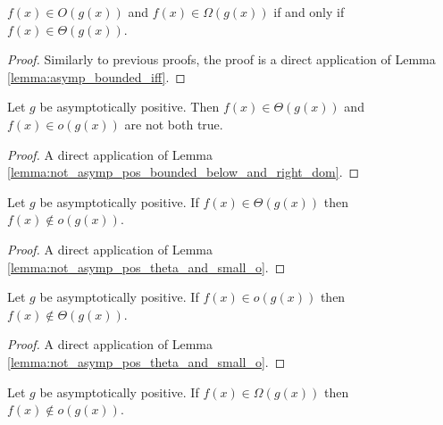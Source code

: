 \begin{theorem}
    \label{thm:big_o_and_omega_iff_theta}
    \leanok
    $f(x) \in O(g(x))$ and $f(x) \in \Omega(g(x))$ if and only if 
    $f(x) \in \Theta(g(x))$.
\end{theorem}

\begin{proof}
    \leanok
    Similarly to previous proofs, the proof is a direct application of Lemma 
    \ref{lemma:asymp_bounded_iff}.
\end{proof}

\begin{lemma}
    \label{lemma:not_asymp_pos_theta_and_small_o}
    \leanok
    Let $g$ be asymptotically positive. Then $f(x) \in \Theta(g(x))$ and $f(x) \in o(g(x))$
    are not both true.
\end{lemma}

\begin{proof}
    \leanok
    A direct application of Lemma \ref{lemma:not_asymp_pos_bounded_below_and_right_dom}.
\end{proof}

\begin{lemma}
    \label{lemma:not_asymp_pos_small_o_of_theta}
    \leanok
    Let $g$ be asymptotically positive. If $f(x) \in \Theta(g(x))$ then $f(x) \notin o(g(x))$.
\end{lemma}

\begin{proof}
    \leanok
    A direct application of Lemma \ref{lemma:not_asymp_pos_theta_and_small_o}.
\end{proof}

\begin{lemma}
    \label{lemma:not_asymp_pos_theta_of_small_o}
    \leanok
    Let $g$ be asymptotically positive. If $f(x) \in o(g(x))$ then $f(x) \notin \Theta(g(x))$.
\end{lemma}

\begin{proof}
    \leanok
    A direct application of Lemma \ref{lemma:not_asymp_pos_theta_and_small_o}.
\end{proof}

\begin{lemma}
    \label{lemma:not_asymp_pos_o_of_big_omega}
    \leanok
    Let $g$ be asymptotically positive. If $f(x) \in \Omega(g(x))$ then $f(x) \notin o(g(x))$.
\end{lemma}

